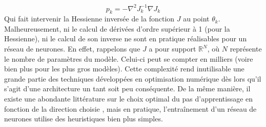 \begin{equation}
	p_k = - \nabla^2 J_k ^{-1} \nabla J_k
\end{equation}
Qui fait intervenir la Hessienne inversée de la fonction $J$ au point $\theta_{k}$. Malheureusement, ni le calcul de dérivées d'ordre supérieur à 1 (pour la Hessienne), ni le calcul de son inverse ne sont en pratique réalisables pour un réseau de neurones. En effet, rappelons que $J$ a pour support $\mathbb{R}^N$, où $N$ représente le nombre de paramètres du modèle. Celui-ci peut se compter en milliers (voire bien plus pour les plus gros modèles). Cette complexité rend inutilisable une grande partie des techniques développées en optimisation numérique dès lors qu'il s'agit d'une architecture un tant soit peu conséquente.
De la même manière, il existe une abondante littérature sur le choix optimal du pas d'apprentissage en fonction de la direction choisie \cite{nocedalLineSearchMethods2006}, mais en pratique, l'entraînement d'un réseau de neurones utilise des heuristiques bien plus simples.

